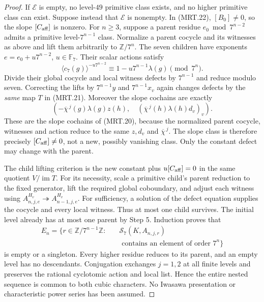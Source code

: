\begin{proof}
If $\mathscr E$ is empty, no level-$49$ primitive class exists,
and no higher primitive class can exist.  Suppose instead that
$\mathscr E$ is nonempty.  In (MRT.22), $[B_0]\ne0$, so the slope
$[C_{\rm aff}]$ is nonzero.  For $n\geq3$, suppose a parent residue
$e_0\bmod7^{n-2}$ admits a primitive level-$7^{n-1}$ class.
Normalize a parent cocycle and its witnesses as above and lift them
arbitrarily to $\mathbb Z/7^n$.  The seven children have exponents
$e=e_0+u7^{n-2}$, $u\in\mathbb F_7$.  Their scalar actions satisfy
\[
 \langle c_7(g)\rangle^{-u7^{n-2}}
              \equiv1-u7^{n-1}\lambda(g)\pmod{7^n}.
 \tag{MRT.33}
\]
Divide their global cocycle and local witness defects by $7^{n-1}$
and reduce modulo seven.  Correcting the lifts by $7^{n-1}y$ and
$7^{n-1}x_v$ again changes defects by the \emph{same} map $T$
in (MRT.21).  Moreover the slope cochains are exactly
\[
 \left(-\overline{\chi}^{\,j}(g)\lambda(g)z(h),\quad
           (\overline{\chi}^{\,j}(h)\lambda(h)d_v)_v\right).
 \tag{MRT.34}
\]
These are the slope cochains of (MRT.20), because the normalized
parent cocycle, witnesses and action reduce to the same $z,d_v$
and $\overline{\chi}^{\,j}$.  The slope class is therefore precisely
$[C_{\rm aff}]\ne0$, not a new, possibly vanishing class.
Only the constant defect may change with the parent.

The child lifting criterion is the new constant plus
$u[C_{\rm aff}]=0$ in the same quotient $V/\operatorname{im}T$.
For its necessity, scale a primitive child's parent reduction to
the fixed generator, lift the required global coboundary, and
adjust each witness using
$A_{n,j,e}^{H_v}\twoheadrightarrow A_{n-1,j,e}^{H_v}$.
For sufficiency, a solution of the defect equation supplies the
cocycle and every local witness.  Thus at most one child survives.
The initial level already has at most one parent by Step 5.
Induction proves that
\[
 \begin{split}
 E_n=\{r\in\mathbb Z/7^{n-1}\mathbb Z:\quad&
       \mathcal S_7(K,A_{n,j,r})\\
       &\text{ contains an element of order }7^n\}
 \end{split}
 \tag{MRT.35}
\]
is empty or a singleton.  Every higher residue reduces to its
parent, and an empty level has no descendants.  Conjugation exchanges
$j=1,2$ at all finite levels and preserves the rational cyclotomic
action and local list.  Hence the entire nested sequence is common
to both cubic characters.  No Iwasawa presentation or characteristic
power series has been assumed.


\end{proof}
